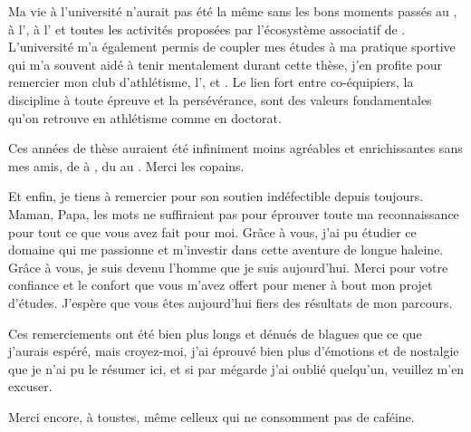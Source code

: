 Ma vie à l'université n'aurait pas été la même sans les bons moments passés 
au , à l', à l' et toutes les activités 
proposées par l'écosystème associatif de .
L'université m'a également permis de coupler mes études à ma pratique sportive
qui m'a souvent aidé à tenir mentalement durant cette thèse,
j'en profite pour remercier mon club d'athlétisme, l', et .
Le lien fort entre co-équipiers, la discipline à toute épreuve et la persévérance,
sont des valeurs fondamentales qu'on retrouve en athlétisme comme en doctorat.

Ces années de thèse auraient été infiniment moins agréables et enrichissantes sans mes amis,
de  à , du  au . Merci les copains.

Et enfin, je tiens à remercier  pour son soutien indéfectible
depuis toujours.
Maman, Papa, les mots ne suffiraient pas pour éprouver toute ma reconnaissance pour tout ce que vous avez fait pour moi.
Grâce à vous, j'ai pu étudier ce domaine qui me passionne et m'investir dans cette 
aventure de longue haleine.
Grâce à vous, je suis devenu l'homme que je suis aujourd'hui. 
Merci pour votre confiance et le confort que vous m'avez offert pour mener à bout mon projet d'études.
J'espère que vous êtes aujourd'hui fiers des résultats de mon parcours.

Ces remerciements ont été bien plus longs et dénués de blagues que ce que j'aurais espéré,
mais croyez-moi,
j'ai éprouvé bien plus d'émotions et de nostalgie que je n'ai pu le résumer ici,
et si par mégarde j'ai oublié quelqu'un, veuillez m'en excuser.

Merci encore, à toustes, même celleux qui ne consomment pas de caféine.
